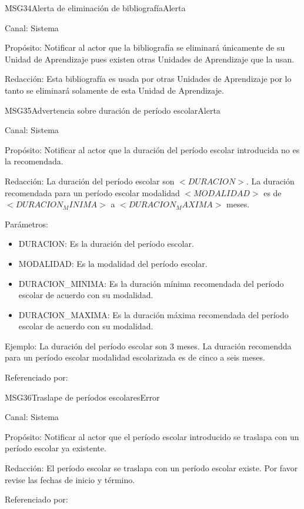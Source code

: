 \begin{mensaje}{MSG34}{Alerta de eliminación de bibliografía}{Alerta}
	\item[Canal:] Sistema
	\item[Propósito:] Notificar al actor que la bibliografía se eliminará únicamente de su Unidad de Aprendizaje pues existen otras Unidades de Aprendizaje que la usan.
	\item[Redacción:] Esta bibliografía es usada por otras Unidades de Aprendizaje por lo tanto se eliminará solamente de esta Unidad de Aprendizaje.
	
\end{mensaje}

\begin{mensaje}{MSG35}{Advertencia sobre duración de período escolar}{Alerta}
	\item[Canal:] Sistema
	\item[Propósito:] Notificar al actor que la duración del período escolar introducida no es la recomendada.
	\item[Redacción:] La duración del período escolar  son $<DURACION>$. La duración recomendada para un período escolar modalidad $<MODALIDAD>$ es de $<DURACION_MINIMA>$ a $<DURACION_MAXIMA>$ meses.
	\item[Parámetros:] 
	\begin{itemize}
		\item DURACION: Es la duración del período escolar.
		\item MODALIDAD: Es la modalidad del período escolar.
		\item DURACION\_MINIMA: Es la duración mínima recomendada del período escolar de acuerdo con su modalidad.
		\item DURACION\_MAXIMA: Es la duración máxima recomendada del período escolar de acuerdo con su modalidad.
	\end{itemize}
	\item[Ejemplo:] La duración del período escolar son 3 meses. La duración recomendda para un período escolar modalidad escolarizada es de cinco a seis meses.
	\item[Referenciado por:] 
\end{mensaje}

\begin{mensaje}{MSG36}{Traslape de períodos escolares}{Error}
	\item[Canal:] Sistema
	\item[Propósito:] Notificar al actor que el período escolar introducido se traslapa con un período escolar ya existente.
	\item[Redacción:] El período escolar se traslapa con un período escolar existe. Por favor revise las fechas de inicio y término.
	\item[Referenciado por:] 
\end{mensaje}


